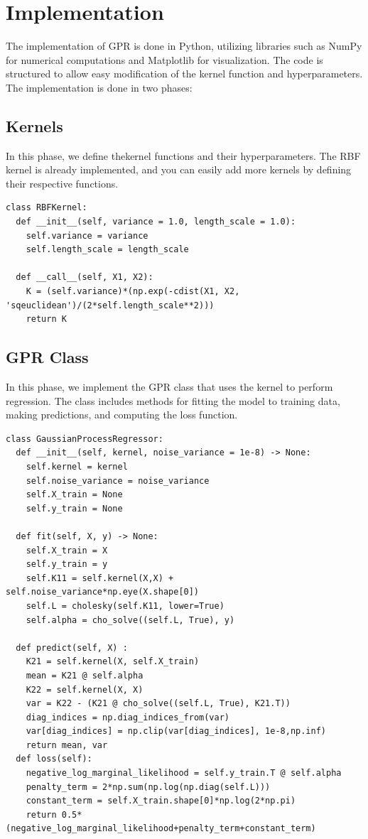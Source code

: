 \documentclass{article}
\begin{document}
\section{Implementation}
\label{sec:implementation}
The implementation of GPR is done in Python, utilizing libraries such as NumPy for numerical computations and Matplotlib for visualization. The code is structured to allow easy modification of the kernel function and hyperparameters. The implementation is done in two phases:
\subsection{Kernels}
In this phase, we define thekernel functions and their hyperparameters. The RBF kernel is already implemented, and you can easily add more kernels by defining their respective functions.
\begin{lstlisting}
class RBFKernel:
  def __init__(self, variance = 1.0, length_scale = 1.0):
    self.variance = variance
    self.length_scale = length_scale

  def __call__(self, X1, X2):
    K = (self.variance)*(np.exp(-cdist(X1, X2, 'sqeuclidean')/(2*self.length_scale**2)))
    return K
\end{lstlisting}
\subsection{GPR Class}
In this phase, we implement the GPR class that uses the kernel to perform regression. The class includes methods for fitting the model to training data, making predictions, and computing the loss function.
\begin{lstlisting}
class GaussianProcessRegressor:
  def __init__(self, kernel, noise_variance = 1e-8) -> None:
    self.kernel = kernel
    self.noise_variance = noise_variance
    self.X_train = None
    self.y_train = None

  def fit(self, X, y) -> None:
    self.X_train = X
    self.y_train = y
    self.K11 = self.kernel(X,X) + self.noise_variance*np.eye(X.shape[0])
    self.L = cholesky(self.K11, lower=True)
    self.alpha = cho_solve((self.L, True), y)

  def predict(self, X) :
    K21 = self.kernel(X, self.X_train)
    mean = K21 @ self.alpha
    K22 = self.kernel(X, X)
    var = K22 - (K21 @ cho_solve((self.L, True), K21.T))
    diag_indices = np.diag_indices_from(var)
    var[diag_indices] = np.clip(var[diag_indices], 1e-8,np.inf)
    return mean, var
  def loss(self):
    negative_log_marginal_likelihood = self.y_train.T @ self.alpha
    penalty_term = 2*np.sum(np.log(np.diag(self.L)))
    constant_term = self.X_train.shape[0]*np.log(2*np.pi)
    return 0.5*(negative_log_marginal_likelihood+penalty_term+constant_term)
\end{lstlisting}
\end{document}
